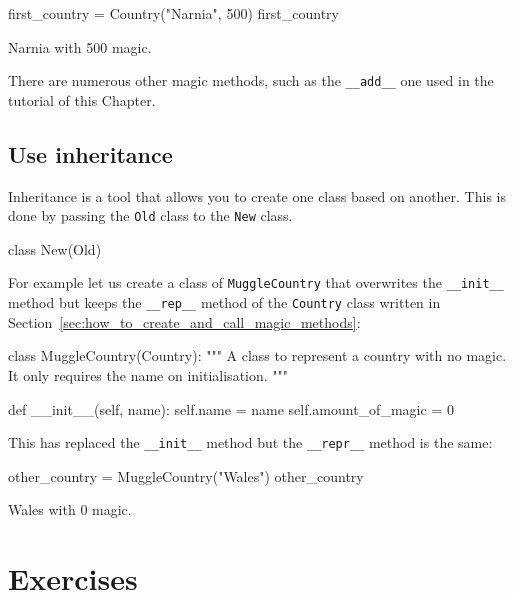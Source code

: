 \begin{pyin}
first_country = Country("Narnia", 500)
first_country
\end{pyin}





\begin{raw}
Narnia with 500 magic.
\end{raw}

There are numerous other magic methods, such as the \texttt{\_\_add\_\_} one used in
the tutorial of this Chapter.

\subsection{Use inheritance}
\label{sec:how_to_use_inheritance}

Inheritance is a tool that allows you to create one class based on another. This
is done by passing the \texttt{Old} class to the \texttt{New} class.

\begin{api}
class New(Old)
\end{api}

For example let us create a class of \texttt{MuggleCountry} that overwrites the
\texttt{\_\_init\_\_} method but keeps the \texttt{\_\_rep\_\_} method of the
\texttt{Country} class written
in Section~\ref{sec:how_to_create_and_call_magic_methods}:

\begin{pyin}
class MuggleCountry(Country):
    """
    A class to represent a country with no magic. It only requires the name on
    initialisation.
    """

    def __init__(self, name):
        self.name = name
        self.amount_of_magic = 0
\end{pyin}

This has replaced the \texttt{\_\_init\_\_} method but the \texttt{\_\_repr\_\_} method is the same:

\begin{pyin}
other_country = MuggleCountry("Wales")
other_country
\end{pyin}

\begin{raw}
Wales with 0 magic.
\end{raw}

\section{Exercises}

